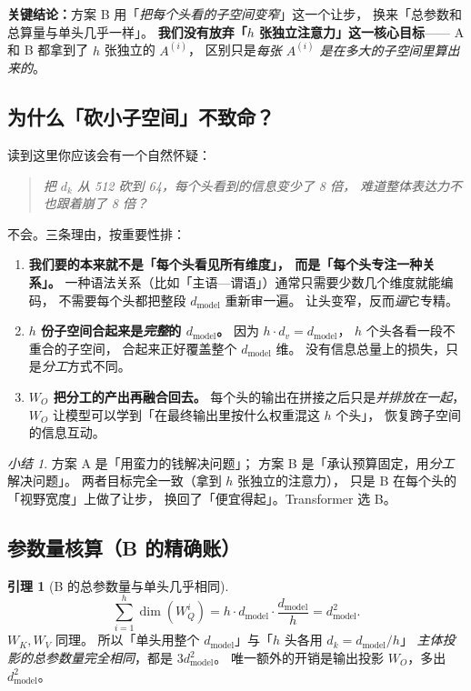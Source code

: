 \documentclass[11pt,a4paper]{ctexart}
\theoremstyle{definition}
\newtheorem{lemma}{引理}
\theoremstyle{remark}
\newtheorem*{summary}{小结}
\begin{document}
\textbf{关键结论：}方案 B 用「\emph{把每个头看的子空间变窄}」这一个让步，
换来「总参数和总算量与单头几乎一样」。
\textbf{我们没有放弃「$h$ 张独立注意力」这一核心目标}——
A 和 B 都拿到了 $h$ 张独立的 $A^{(i)}$，
区别只是\emph{每张 $A^{(i)}$ 是在多大的子空间里算出来的}。

\subsection{为什么「砍小子空间」不致命？}

读到这里你应该会有一个自然怀疑：

\begin{quote}
\emph{把 $d_k$ 从 512 砍到 64，每个头看到的信息变少了 8 倍，
难道整体表达力不也跟着崩了 8 倍？}
\end{quote}

不会。三条理由，按重要性排：

\begin{enumerate}
  \item \textbf{我们要的本来就不是「每个头看见所有维度」，
        而是「每个头专注一种关系」。}
        一种语法关系（比如「主语—谓语」）通常只需要少数几个维度就能编码，
        不需要每个头都把整段 $d_{\text{model}}$ 重新审一遍。
        让头变窄，反而\emph{逼}它专精。
  \item \textbf{$h$ 份子空间合起来是\emph{完整}的 $d_{\text{model}}$。}
        因为 $h \cdot d_v = d_{\text{model}}$，
        $h$ 个头各看一段不重合的子空间，
        合起来正好覆盖整个 $d_{\text{model}}$ 维。
        没有信息总量上的损失，只是\emph{分工}方式不同。
  \item \textbf{$W_O$ 把分工的产出再融合回去。}
        每个头的输出在拼接之后只是\emph{并排放在一起}，
        $W_O$ 让模型可以学到「在最终输出里按什么权重混这 $h$ 个头」，
        恢复跨子空间的信息互动。
\end{enumerate}

\begin{summary}
方案 A 是「用蛮力的钱解决问题」；
方案 B 是「承认预算固定，用\emph{分工}解决问题」。
两者目标完全一致（拿到 $h$ 张独立的注意力），
只是 B 在每个头的「视野宽度」上做了让步，
换回了「便宜得起」。Transformer 选 B。
\end{summary}

\subsection{参数量核算（B 的精确账）}

\begin{lemma}[B 的总参数量与单头几乎相同]
\[
  \sum_{i=1}^{h} \dim(W_Q^i)
  = h \cdot d_{\text{model}} \cdot \frac{d_{\text{model}}}{h}
  = d_{\text{model}}^2.
\]
$W_K, W_V$ 同理。
所以「单头用整个 $d_{\text{model}}$」与「$h$ 头各用 $d_k = d_{\text{model}}/h$」
\emph{主体投影的总参数量完全相同}，都是 $3 d_{\text{model}}^2$。
唯一额外的开销是输出投影 $W_O$，多出 $d_{\text{model}}^2$。
\end{lemma}
\end{document}
